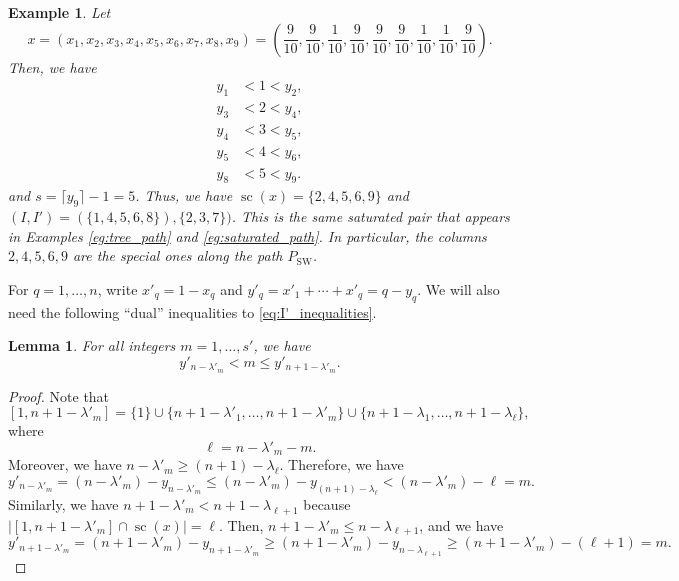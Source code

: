 \documentclass[12pt]{amsart}
\newtheorem{example}[definition]{Example}
\newtheorem{lemma}[definition]{Lemma}
\DeclareMathOperator{\SW}{SW}
\DeclareMathOperator{\SC}{sc}
\begin{document}
\begin{example}\label{eg:find_I}
    Let
    \begin{equation*}
        x=(x_1,x_2,x_3,x_4,x_5,x_6,x_7,x_8,x_9)=\left(\frac{9}{10},\frac{9}{10},\frac{1}{10},\frac{9}{10},\frac{9}{10},\frac{9}{10},\frac{1}{10},\frac{1}{10},\frac{9}{10}\right).
    \end{equation*}
    Then, we have
    \begin{align*}
        y_1&<1<y_2,\\
        y_3&<2<y_4,\\
        y_4&<3<y_5,\\
        y_5&<4<y_6,\\
        y_8&<5<y_9.
    \end{align*}
    and $s=\lceil y_9\rceil-1=5$. Thus, we have $\SC(x)=\{2,4,5,6,9\}$ and $(I,I')=(\{1,4,5,6,8\}),\{2,3,7\})$. This is the same saturated pair that appears in Examples \ref{eg:tree_path} and \ref{eg:saturated_path}. In particular, the columns $2,4,5,6,9$ are the special ones along the path $P_{\SW}$.
\end{example}

For $q=1,\ldots,n$, write $x'_q=1-x_q$ and $y'_q=x'_1+\cdots+x'_q=q-y_q$. We will also need the following ``dual'' inequalities to \eqref{eq:I'_inequalities}.

\begin{lemma}\label{lem:dual_ineqs}
    For all integers $m=1,\ldots,s'$, we have
    \begin{equation}\label{eq:I_inequalities}
       y'_{n-\lambda'_{m}}< m\le y'_{n+1-\lambda'_{m}}.
    \end{equation}
\end{lemma}

\begin{proof}
Note that
\begin{equation}\label{eq:disjoint_union}
    [1,n+1-\lambda'_m] =\{1\}\cup \{n+1-\lambda'_1,\ldots,n+1-\lambda'_m\}\cup \{n+1-\lambda_1,\ldots,n+1-\lambda_\ell\},
\end{equation}
where 
\begin{equation*}
    \ell=n-\lambda'_m-m.
\end{equation*}
Moreover, we have $n-\lambda'_m\ge (n+1)-\lambda_\ell$. Therefore, we have
\begin{equation*}
    y'_{n-\lambda'_m}=(n-\lambda'_m)-y_{n-\lambda'_m}\le (n-\lambda'_m)-y_{(n+1)-\lambda_\ell}<(n-\lambda'_m)-\ell=m.
\end{equation*}
Similarly, we have $n+1-\lambda'_m < n+1-\lambda_{\ell+1}$ because $|[1,n+1-\lambda'_m] \cap \SC(x)| = \ell$. Then, $n+1-\lambda'_m \le n-\lambda_{\ell+1}$, and we have
\begin{equation*}
    y'_{n+1-\lambda'_m} = (n+1-\lambda'_m)-y_{n+1-\lambda'_m} \ge (n+1-\lambda'_m)-y_{n-\lambda_{\ell+1}} \ge (n+1-\lambda'_m)-(\ell+1) = m. 
\end{equation*}
\end{proof}
\end{document}
